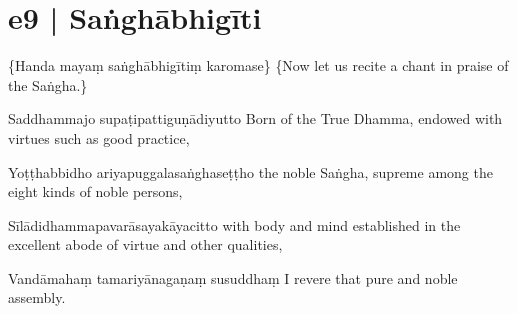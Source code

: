 \section*{e9 | Saṅghābhigīti}

\begin{chantsubsection}
  \chantnote
    {\{Handa mayaṃ saṅghābhigītiṃ karomase\}}
  \chantnotetrans
    {\{Now let us recite a chant in praise of the Saṅgha.\}}
\end{chantsubsection}

\chantgap

\begin{chantsubsection}
  \chantline
    {Saddhammajo supaṭipattiguṇādiyutto}
    {Born of the True Dhamma, endowed with virtues such as good practice,}

  \chantline
    {Yoṭṭhabbidho ariyapuggalasaṅghaseṭṭho}
    {the noble Saṅgha, supreme among the eight kinds of noble persons,}

  \chantline
    {Sīlādidhammapavarāsayakāyacitto}
    {with body and mind established in the excellent abode of virtue and other qualities,}

  \chantline
    {Vandāmahaṃ tamariyānagaṇaṃ susuddhaṃ}
    {I revere that pure and noble assembly.}
\end{chantsubsection}

\newpage

